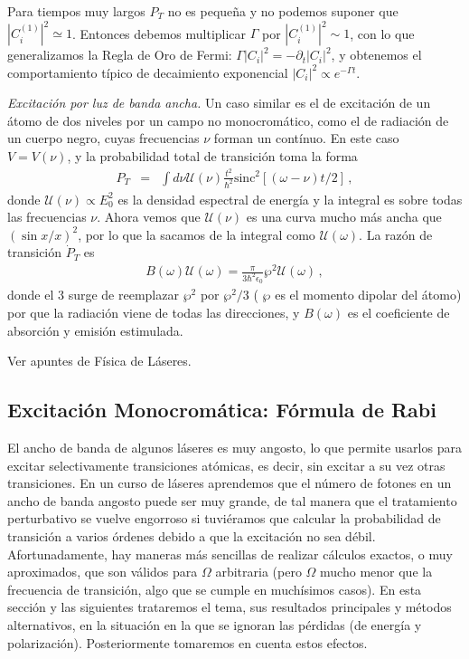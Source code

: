 \documentclass[twocolumn,aps,eqsecnum]{revtex4}
\begin{document}
Para tiempos muy largos $P_T$ no es peque\~na y no podemos 
suponer que $|C_i^{(1)}|^2 \simeq 1$. Entonces debemos multiplicar 
$\Gamma$ por $|C_i^{(1)}|^2 \sim 1$, con lo que generalizamos la 
Regla de Oro de Fermi: $\Gamma |C_i|^2 = - \partial_t |C_i|^2$,  y 
obtenemos el comportamiento t\'ipico de decaimiento exponencial 
$|C_i|^2 \propto e^{- \Gamma t}$. 

\vspace{3mm}
\textit{Excitaci\'on por luz de banda ancha.}
\newline Un caso similar es el de excitaci\'on de un \'atomo de dos niveles 
por un campo no monocrom\'atico, como el de radiaci\'on de un cuerpo negro, 
cuyas frecuencias $\nu$ forman un cont\'inuo. En este caso $V = V(\nu)$, y 
la probabilidad total de transici\'on toma la forma  
%
\begin{eqnarray}  
P_T &=& \int d\nu \mathcal{U}(\nu) \frac{t^2}{\hbar^2}   
	  \mathrm{sinc}^2{[(\omega -\nu) t/2]}   		\,,
\end{eqnarray}
donde $\mathcal{U}(\nu) \propto E_0^2$ es la densidad espectral de 
energ\'ia y la integral es sobre todas las frecuencias $\nu$. Ahora vemos que 
$\mathcal{U}(\nu)$ es una curva mucho m\'as ancha que $(\sin{x}/x)^2$, por 
lo que la sacamos de la integral como $\mathcal{U}(\omega)$. La raz\'on de 
transici\'on $\dot{P}_T$ es 
%
\begin{eqnarray}  
B(\omega) \mathcal{U}(\omega) 
	= \frac{\pi}{3\hbar^2 \epsilon_0} \wp^2 \mathcal{U}(\omega) \,,
\end{eqnarray}
donde el 3 surge de reemplazar $\wp^2$ por $\wp^2/3$ (  $\wp$ es el 
momento dipolar del \'atomo) por que la radiaci\'on viene de todas las 
direcciones, y $B(\omega)$ es el coeficiente de absorci\'on y emisi\'on 
estimulada. 

Ver apuntes de F\'isica de L\'aseres. 

\subsection{Excitaci\'on Monocrom\'atica: F\'ormula de Rabi} 
El ancho de banda de algunos l\'aseres es muy angosto, lo que permite 
usarlos para excitar selectivamente transiciones at\'omicas, es decir, sin 
excitar a su vez otras transiciones. En un curso de l\'aseres aprendemos 
que el n\'umero de fotones en un ancho de banda angosto puede ser muy 
grande, de tal manera que el tratamiento perturbativo se vuelve engorroso si 
tuvi\'eramos que calcular la probabilidad de transici\'on a varios \'ordenes 
debido a que la excitaci\'on no sea d\'ebil. Afortunadamente, hay maneras 
m\'as sencillas de realizar c\'alculos exactos, o muy aproximados, que son 
v\'alidos para $\Omega$ arbitraria (pero $\Omega$ mucho menor que la 
frecuencia de transici\'on, algo que se cumple en much\'isimos casos). En 
esta secci\'on y las siguientes trataremos el tema, sus resultados principales 
y m\'etodos alternativos, en la situaci\'on en la que se ignoran las p\'erdidas 
(de energ\'ia y polarizaci\'on). Posteriormente tomaremos en cuenta estos 
efectos.  
\end{document}
